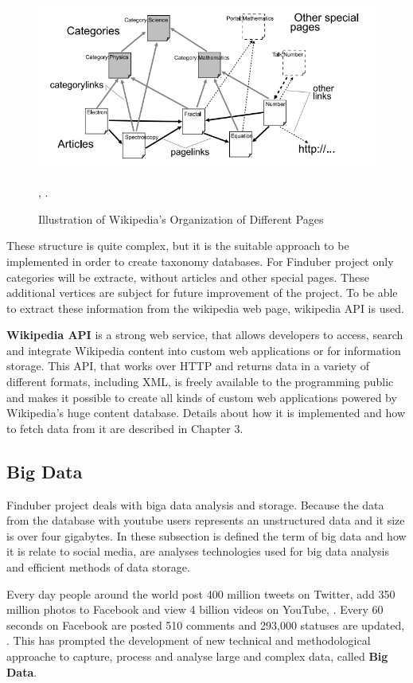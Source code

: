 \begin{figure}[!ht]
\centering
\includegraphics[width=15cm]{categorytreewiki}
\caption{Illustration of Wikipedia’s Organization of Different Pages}\label{category-tree-wiki}, \cite{wikicategory}.
\end{figure}

These structure is quite complex, but it is the suitable approach to be implemented in order to create taxonomy databases. For Finduber project only categories will be extracte, without articles and other special pages. These additional vertices are subject for future improvement of the project. To be able to extract these information from the wikipedia web page, wikipedia API is used.

\textbf{Wikipedia API} is a strong web service, that allows developers to access, search and integrate Wikipedia content into custom web applications or for information storage. This API, that works over HTTP and returns data in a variety of different formats, including XML, is freely available to the programming public and makes it possible to create all kinds of custom web applications powered by Wikipedia's huge content database. Details about how it is implemented and how to fetch data from it are described in Chapter 3.

\subsection{Big Data}

Finduber project deals with biga data analysis and storage. Because the data from the database with youtube users represents an unstructured data and it size is over four gigabytes. In these subsection is defined the term of big data and how it is relate to social media, are analyses technologies used for big data analysis and efficient methods of data storage. 

Every day people around the world post 400 million tweets on Twitter, add 350 million photos to Facebook and view 4 billion videos on YouTube, \cite{digitalInfo}. Every 60 seconds on Facebook are posted 510 comments and 293,000 statuses are updated, \cite{zephoria}. This has prompted the development of new technical and methodological approache to capture, process and analyse large and complex data, called \textbf{Big Data}. 

